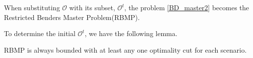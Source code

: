 When substituting $\mathcal{O}$ with its subset, $\mathcal{O}^{t}$, the problem \eqref{BD_master2} becomes the Restricted Benders Master Problem(RBMP). 





To determine the initial $\mathcal{O}^{t}$, we have the following lemma.

\begin{lem}\label{one_ep_feasible}
RBMP is always bounded with at least any one optimality cut for each scenario.
\end{lem}

